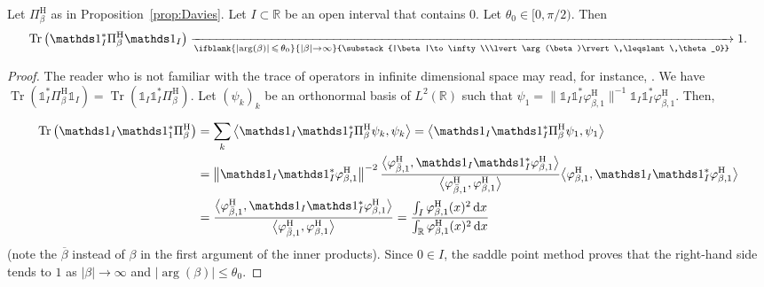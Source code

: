 \documentclass[AHL,Unicode,longabstracts,published]{cedram}
\renewcommand{\leq}{\leqslant}
\newcommand{\1}{\mathds 1}
\newcommand{\limt}[3][]{\xrightarrow[\ifblank{#1}{#2 \to #3}{\substack{#2\to #3\\#1}}]{}}
\DeclareMathOperator{\Tr}{Tr}
\newcommand{\R}{\mathbb{R}}
\newcommand{\diff}[1][-3]{\ensuremath{\mathop{}\mkern#1mu\mathrm{d}}}
\newcommand{\h}{{\mathrm{H}}}
\renewcommand{\b}{\beta}
\renewcommand{\th}{\theta}
\newcommand{\f}{\varphi}
\begin{document}
\begin{coro}\label{th-trace-eigenproj}
Let $\Pi_\b^\h$ as in Proposition~\ref{prop:Davies}. Let $I\subset \R$ be an open interval that contains $0$. Let $\th_0 \in [0,\pi/2)$. Then
\[
\Tr\left(\1_I^* \Pi^\h_{\b} \1_I\right) \limt[\lvert \arg(\b)\rvert\,\leq\,\th_0]{|\b|}{\infty} 1.
\]
\end{coro}
\begin{proof}
The reader who is not familiar with the trace of operators in infinite dimensional space may read, for instance, \cite[Chapter~10, \S1.3--1.4]{Kato95}. We have $\Tr(\1_I^* \Pi^\h_{\b} \1_I) = \Tr(\1_I \1_I^* \Pi^\h_{\b})$. Let $(\psi_k)_k$ be an orthonormal basis of $L^2(\R)$ such that $\psi_1 = \|\1_I\1_I^*\f_{\b,1}^\h\|^{-1}\1_I\1_I^*\f_{\b,1}^\h$. Then,

\begin{align*}
\Tr\left(\1_I\1_1^*\Pi_\b^\h\right) &= \sum_k \big\langle\1_I\1_I^*\Pi_\b^\h \psi_k, \psi_k\big\rangle
= \big\langle\1_I\1_I^*\Pi_\b^\h \psi_1, \psi_1\big\rangle\\
&= \left\|\1_I\1_I^*\f_{\b,1}^\h\right\|^{-2}\dfrac {\big\langle \f_{\bar \b,1}^\h,\1_I\1_I^* \f_{\b,1}^\h \big\rangle} {\big\langle \f_{\bar \b,1}^\h, \f_{\b,1}^\h \big\rangle} \big\langle \f_{\b,1}^\h, \1_I\1_I^* \f_{\b,1}^\h\big\rangle\\
&=\dfrac{\big\langle \f_{\bar \b,1}^\h,\1_I\1_I^* \f_{\b,1}^\h \big\rangle} {\big\langle \f_{\bar \b,1}^\h, \f_{\b,1}^\h \big\rangle}
= \dfrac{\int_I \f_{\b,1}^\h(x)^2\diff x}{ \int_\R \f_{\b,1}^\h(x)^2 \diff x}
\end{align*}
(note the $\overline \beta$ instead of $\beta$ in the first argument of the inner products). Since $0\in I$, the saddle point method proves that the right-hand side tends to $1$ as $|\beta|\to \infty$ and $\lvert\arg(\b)\rvert \leq \th_0$.
\end{proof}



\end{document}
